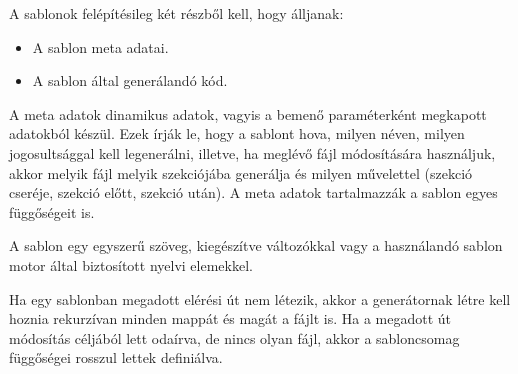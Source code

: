 \documentclass[a4paper,12pt,oneside]{report}
\begin{document}
\begin{justify}
	A sablonok felépítésileg két részből kell, hogy álljanak:

    \begin{itemize}
        \item A sablon meta adatai.
        \item A sablon által generálandó kód.
    \end{itemize}

	A meta adatok dinamikus adatok, vagyis a bemenő paraméterként megkapott adatokból készül. Ezek írják le, hogy a sablont hova, milyen néven, milyen jogosultsággal kell legenerálni, illetve, ha meglévő fájl módosítására használjuk, akkor melyik fájl melyik szekciójába generálja és milyen művelettel (szekció cseréje, szekció előtt, szekció után). A meta adatok tartalmazzák a sablon egyes függőségeit is. 

	A sablon egy egyszerű szöveg, kiegészítve változókkal vagy a használandó sablon motor által biztosított nyelvi elemekkel.

	Ha egy sablonban megadott elérési út nem létezik, akkor a generátornak létre kell hoznia rekurzívan minden mappát és magát a fájlt is. Ha a megadott út módosítás céljából lett odaírva, de nincs olyan fájl, akkor a sabloncsomag függőségei rosszul lettek definiálva.

\end{justify}

\newpage
\end{document}
